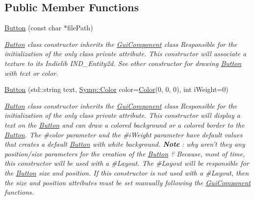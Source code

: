 \subsection*{Public Member Functions}
\begin{DoxyCompactItemize}
\item 
\hyperlink{class_symp_1_1_button_a2de1604451d582a7c2e22344305212e5}{Button} (const char $\ast$file\-Path)
\begin{DoxyCompactList}\small\item\em \hyperlink{class_symp_1_1_button}{Button} class constructor inherits the \hyperlink{class_symp_1_1_gui_component}{Gui\-Component} class Responsible for the initialization of the only class private attribute. This constructor will associate a texture to its Indielib I\-N\-D\-\_\-\-Entity2d. See other constructor for drawing \hyperlink{class_symp_1_1_button_a2de1604451d582a7c2e22344305212e5}{Button} with text or color. \end{DoxyCompactList}\item 
\hyperlink{class_symp_1_1_button_a287f3fdf47224b349168a154534a8f30}{Button} (std\-::string text, \hyperlink{struct_symp_1_1_color}{Symp\-::\-Color} color=\hyperlink{struct_symp_1_1_color}{Color}(0, 0, 0), int i\-Weight=0)
\begin{DoxyCompactList}\small\item\em \hyperlink{class_symp_1_1_button}{Button} class constructor inherits the \hyperlink{class_symp_1_1_gui_component}{Gui\-Component} class Responsible for the initialization of the only class private attribute. This constructor will display a text on the \hyperlink{class_symp_1_1_button_a2de1604451d582a7c2e22344305212e5}{Button} and can draw a colored background or a colored border to the \hyperlink{class_symp_1_1_button_a2de1604451d582a7c2e22344305212e5}{Button}. The \#color parameter and the \#i\-Weight parameter have default values that creates a default \hyperlink{class_symp_1_1_button_a2de1604451d582a7c2e22344305212e5}{Button} with white background. {\bfseries Note} \-: why aren't they any position/size parameters for the creation of the \hyperlink{class_symp_1_1_button_a2de1604451d582a7c2e22344305212e5}{Button} ? Because, most of time, this constructor will be used with a \#\-Layout. The \#\-Layout will be responsible for the \hyperlink{class_symp_1_1_button_a2de1604451d582a7c2e22344305212e5}{Button} size and position. If this constructor is not used with a \#\-Layout, then the size and position attributes must be set manually following the \hyperlink{class_symp_1_1_gui_component_a22124675c2976983ac18374f81cc3fb3}{Gui\-Component} functions. \end{DoxyCompactList}\item 

\end{DoxyCompactItemize}
